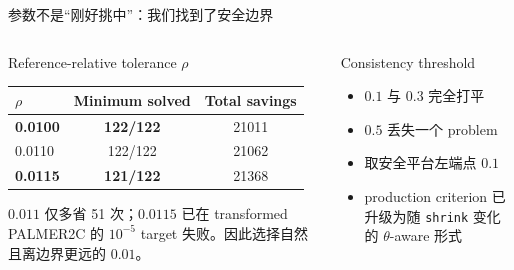 \documentclass[aspectratio=169,10pt]{beamer}
\newcommand{\good}[1]{\textcolor{BDSGreen}{\bfseries #1}}
\newcommand{\warn}[1]{\textcolor{BDSOrange}{\bfseries #1}}
\newcommand{\tight}{\setlength{\itemsep}{0.35em}\setlength{\parskip}{0pt}}
\begin{document}
\begin{frame}{参数不是“刚好挑中”：我们找到了安全边界}
\small
\begin{columns}[T,onlytextwidth]
\begin{block}{Reference-relative tolerance $\rho$}
\begin{tabular}{lcc}
\toprule
$\rho$ & Minimum solved & Total savings \\
\midrule
\good{0.0100} & \good{122/122} & 21011 \\
0.0110 & 122/122 & 21062 \\
\warn{0.0115} & \warn{121/122} & 21368 \\
\bottomrule
\end{tabular}

\medskip
$0.011$ 仅多省 51 次；$0.0115$ 已在 transformed PALMER2C 的 $10^{-5}$ target 失败。因此选择自然且离边界更远的 $0.01$。
\end{block}

\begin{block}{Consistency threshold}
\begin{itemize}\tight
  \item $0.1$ 与 $0.3$ 完全打平
  \item $0.5$ 丢失一个 problem
  \item 取安全平台左端点 $0.1$
  \item production criterion 已升级为随 \texttt{shrink} 变化的 $\theta$-aware 形式
\end{itemize}
\end{block}
\end{columns}
\end{frame}
\end{document}
